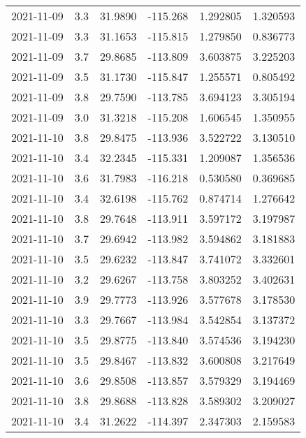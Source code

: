\begin{tabular}{lrrrrr}
2021-11-09 &       3.3 &  31.9890 &  -115.268 &         1.292805 &         1.320593 \\
2021-11-09 &       3.3 &  31.1653 &  -115.815 &         1.279850 &         0.836773 \\
2021-11-09 &       3.7 &  29.8685 &  -113.809 &         3.603875 &         3.225203 \\
2021-11-09 &       3.5 &  31.1730 &  -115.847 &         1.255571 &         0.805492 \\
2021-11-09 &       3.8 &  29.7590 &  -113.785 &         3.694123 &         3.305194 \\
2021-11-09 &       3.0 &  31.3218 &  -115.208 &         1.606545 &         1.350955 \\
2021-11-10 &       3.8 &  29.8475 &  -113.936 &         3.522722 &         3.130510 \\
2021-11-10 &       3.4 &  32.2345 &  -115.331 &         1.209087 &         1.356536 \\
2021-11-10 &       3.6 &  31.7983 &  -116.218 &         0.530580 &         0.369685 \\
2021-11-10 &       3.4 &  32.6198 &  -115.762 &         0.874714 &         1.276642 \\
2021-11-10 &       3.8 &  29.7648 &  -113.911 &         3.597172 &         3.197987 \\
2021-11-10 &       3.7 &  29.6942 &  -113.982 &         3.594862 &         3.181883 \\
2021-11-10 &       3.5 &  29.6232 &  -113.847 &         3.741072 &         3.332601 \\
2021-11-10 &       3.2 &  29.6267 &  -113.758 &         3.803252 &         3.402631 \\
2021-11-10 &       3.9 &  29.7773 &  -113.926 &         3.577678 &         3.178530 \\
2021-11-10 &       3.3 &  29.7667 &  -113.984 &         3.542854 &         3.137372 \\
2021-11-10 &       3.5 &  29.8775 &  -113.840 &         3.574536 &         3.194230 \\
2021-11-10 &       3.5 &  29.8467 &  -113.832 &         3.600808 &         3.217649 \\
2021-11-10 &       3.6 &  29.8508 &  -113.857 &         3.579329 &         3.194469 \\
2021-11-10 &       3.8 &  29.8688 &  -113.828 &         3.589302 &         3.209027 \\
2021-11-10 &       3.4 &  31.2622 &  -114.397 &         2.347303 &         2.159583 \\

\end{tabular}
